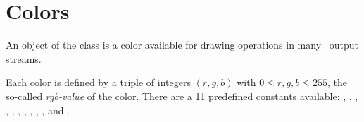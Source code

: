 
\section{Colors}

An object of the class  is a color available
for drawing operations in many \cgal\ output streams.


Each color is defined by a triple of integers $(r,g,b)$ with
$0\le r,g,b \le 255$, the so-called {\em rgb-value} of the color.
There are a 11 predefined  constants available:
, , , , ,
, , , , ,
and .

